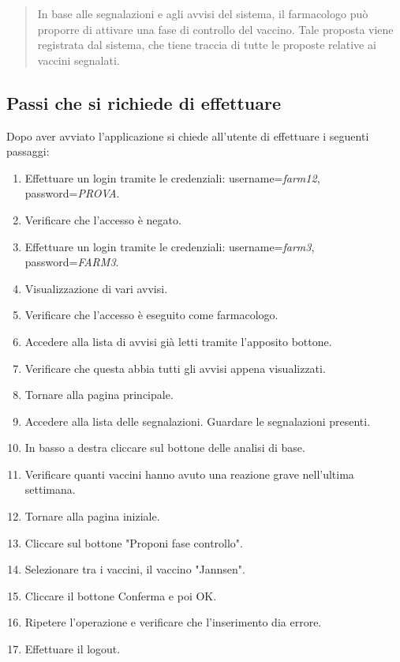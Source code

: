 \documentclass[11pt]{article}
\begin{document}
\begin{quotation}
{                In base alle segnalazioni e agli avvisi del sistema, il farmacologo può proporre di attivare una fase di controllo del vaccino. Tale proposta viene registrata dal sistema, che tiene traccia di tutte le proposte relative ai vaccini segnalati.
            }
            \end{quotation}
    
            \subsection*{Passi che si richiede di effettuare}
            
                Dopo aver avviato l'applicazione si chiede all'utente di effettuare i seguenti passaggi:
                \begin{enumerate}
                    \item Effettuare un login tramite le credenziali: username=\textit{farm12}, password=\textit{PROVA}.
                    \item Verificare che l'accesso è negato.
                    \item Effettuare un login tramite le credenziali: username=\textit{farm3}, password=\textit{FARM3}.
                    \item Visualizzazione di vari avvisi.
                    \item Verificare che l'accesso è eseguito come farmacologo.
                    \item Accedere alla lista di avvisi già letti tramite l'apposito bottone.
                    \item Verificare che questa abbia tutti gli avvisi appena visualizzati.
                    \item Tornare alla pagina principale.
                    \item Accedere alla lista delle segnalazioni. Guardare le segnalazioni presenti. 
                    \item In basso a destra cliccare sul bottone delle analisi di base.
                    \item Verificare quanti vaccini hanno avuto una reazione grave nell'ultima settimana.
                    \item Tornare alla pagina iniziale.
                    \item Cliccare sul bottone "Proponi fase controllo".
                    \item Selezionare tra i vaccini, il vaccino "Jannsen".
                    \item Cliccare il bottone Conferma e poi OK.
                    \item Ripetere l'operazione e verificare che l'inserimento dia errore.
                    \item Effettuare il logout.
                \end{enumerate}
            
\end{document}
